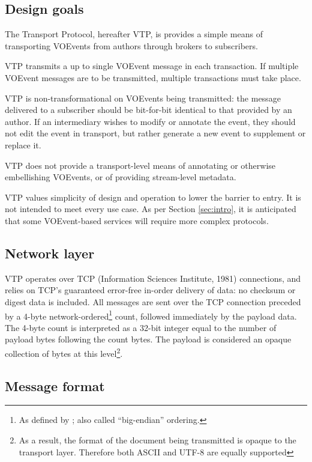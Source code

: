 \documentclass[a4paper,11pt]{ivoa}
\begin{document}
\subsection{Design goals}

The Transport Protocol, hereafter VTP, is provides a simple means of
transporting VOEvents from authors through brokers to subscribers.

VTP transmits a up to single VOEvent message in each transaction. If multiple
VOEvent messages are to be transmitted, multiple transactions must take place.

VTP is non-transformational on VOEvents being transmitted: the message
delivered to a subscriber should be bit-for-bit identical to that provided by
an author. If an intermediary wishes to modify or annotate the event, they
should not edit the event in transport, but rather generate a new event to
supplement or replace it.

VTP does not provide a transport-level means of annotating or otherwise
embellishing VOEvents, or of providing stream-level metadata.

VTP values simplicity of design and operation to lower the barrier to entry. It
is not intended to meet every use case. As per Section \ref{sec:intro}, it is
anticipated that some VOEvent-based services will require more complex
protocols.

\subsection{Network layer}

VTP operates over TCP (Information Sciences Institute, 1981) connections, and
relies on TCP's guaranteed error-free in-order delivery of data: no checksum
or digest data is included. All messages are sent over the TCP connection
preceded by a 4-byte network-ordered\footnote{As defined by
\citet{Reynolds:1994}; also called ``big-endian'' ordering.} count, followed
immediately by the payload data. The 4-byte count is interpreted as a 32-bit
integer equal to the number of payload bytes following the count bytes. The
payload is considered an opaque collection of bytes at this level\footnote{As
a result, the format of the document being transmitted is opaque to the
transport layer. Therefore both ASCII and UTF-8 are equally supported}.

\subsection{Message format}
\label{sec:common:format}
\end{document}
